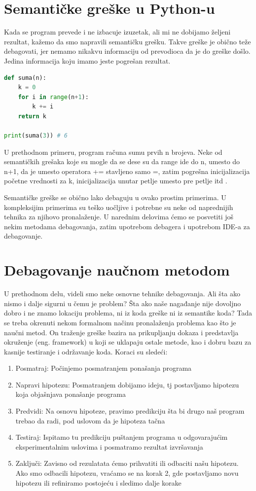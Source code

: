 \documentclass[a4paper]{article}
\begin{document}
\section{Semantičke greške u Python-u}	
Kada se program prevede i ne izbacuje izuzetak, ali mi ne dobijamo željeni rezultat, kažemo da smo napravili semantičku grešku. Takve greške je obično teže debagovati, jer nemamo nikakvu informaciju od prevodioca da je do greške došlo. Jedina informacija koju imamo jeste pogrešan rezultat.
\begin{lstlisting}[language = python, caption = {Funkcija koja računa sumu prvih n brojeva}]
def suma(n):
    k = 0
    for i in range(n+1):
        k += i
    return k

print(suma(3)) # 6
\end{lstlisting}

U prethodnom primeru, program računa sumu prvih n brojeva. Neke od semantičkih grešaka koje su mogle da se dese su da range ide do n, umesto do n+1, da je umesto operatora += stavljeno samo =, zatim pogrešna inicijalizacija početne vrednosti za k, inicijalizacija unutar petlje umesto pre petlje itd \cite{proPyDeb}.

Semantičke greške se obično lako debaguju u ovako prostim primerima. U kompleksijim primerima su teško uočljive i potrebne su neke od naprednijih tehnika za njihovo pronalaženje. U narednim delovima ćemo se posvetiti još nekim metodama debagovanja, zatim upotrebom debagera i upotrebom IDE-a za debagovanje.

\section{Debagovanje naučnom metodom}
U prethodnom delu, videli smo neke osnovne tehnike debagovanja. Ali šta ako nismo i dalje sigurni u čemu je problem? Šta ako naše nagađanje nije dovoljno dobro i ne znamo lokaciju problema, ni iz koda greške ni iz semantike koda? Tada se treba okrenuti nekom formalnom načinu pronalaženja problema kao što je naučni metod. On traženje greške bazira na prikupljanju dokaza i predstavlja okruženje (eng. framework) u koji se uklapaju ostale metode, kao i dobru bazu za kasnije testiranje i održavanje koda.
	 Koraci su sledeći\cite{proPyDeb}:
	 \begin{enumerate}
	     \item Posmatraj: Počinjemo posmatranjem ponašanja programa 
	     \item Napravi hipotezu: Posmatranjem dobijamo ideju, tj postavljamo hipotezu koja objašnjava ponašanje programa
	     \item Predvidi: Na osnovu hipoteze, pravimo predikciju šta bi drugo naš program trebao da radi, pod uslovom da je hipoteza tačna
	     \item Testiraj: Ispitamo tu predikciju puštanjem programa u odgovarajućim eksperimentalnim uslovima i posmatramo rezultat izvršavanja
	     \item Zaključi: Zavisno od rezulatata ćemo prihvatiti ili odbaciti našu hipotezu. Ako smo odbacili hipotezu, vraćamo se na korak 2, gde postavljamo novu hipotezu ili refiniramo postojeću i sledimo dalje korake
	 \end{enumerate}
\end{document}
